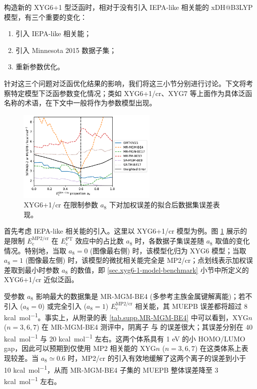 构造新的 XYG6+1 型泛函时，相对于没有引入 IEPA-like 相关能的 xDH@B3LYP 模型，有三个重要的变化：
\begin{enumerate}[nosep]
  \item 引入 IEPA-like 相关能；
  \item 引入 Minnesota 2015 数据子集；
  \item 重新参数优化。
\end{enumerate}
针对这三个问题对泛函优化结果的影响，我们将这三小节分别进行讨论。下文将考察特定模型下泛函参数变化情况；类如 XYG6+1/cr、XYG7 等上面作为具体泛函名称的术语，在下文中一般将作为参数模型出现。

\begin{figure}[h]
  \centering
  \caption{XYG6+1/cr 在限制参数 $a_8$ 下对加权误差的拟合后数据集误差表现。}
  \label{fig.plot-seq-cr-proportion}
  \includegraphics[width=0.6\textwidth]{assets/plot-seq-cr-proportion.pdf}
\end{figure}

首先考虑 IEPA-like 相关能的引入。这里以 XYG6+1/cr 模型为例。图 \ref{fig.plot-seq-cr-proportion} 展示的是限制 $E_\mathrm{c}^\text{MP2/cr}$ 在 $E_\mathrm{c}^\mathrm{PT}$ 效应中的占比数 $a_8$ 时，各数据子集误差随 $a_8$ 取值的变化情况。特别地，当取 $a_8 = 0$ (图像最右侧) 时，该模型化归为 XYG6 模型；当取 $a_8 = 1$ (图像最左侧) 时，该模型的微扰相关能完全是 MP2/cr；点划线表示加权误差取到最小时参数 $a_8$ 的数值，即 \ref{sec.xyg6-1-model-benchmark} 小节中所定义的 XYG6+1/cr 近似泛函。

受参数 $a_8$ 影响最大的数据集是 MR-MGM-BE4 (多参考主族金属键解离能)；若不引入 ($a_8 = 0$) 或完全引入 ($a_8 = 1$) $E_\mathrm{c}^\mathrm{MP2/cr}$ 相关能，其 MUEPB 误差都将超过 8 \si{kcal.mol^{-1}}。事实上，从附录的表 \ref{tab.supp.MR-MGM-BE4} 中可以看到，XYG$n$ ($n=3,6,7$) 在 MR-MGM-BE4 测评中，阴离子  与  的误差很大；其误差分别在 40 \si{kcal.mol^{-1}} 与 20 \si{kcal.mol^{-1}} 左右。这两个体系具有 1 eV 的小 HOMO/LUMO gap，因此可以预期到仅使用 MP2 相关能的 XYG$n$ ($n=3,6,7$) 在这类体系上表现较差。当 $a_8 \simeq 0.6$ 时，MP2/cr 的引入有效地缓解了这两个离子的误差到小于 10 \si{kcal.mol^{-1}}，从而 MR-MGM-BE4 子集的 MUEPB 整体误差降至 3 \si{kcal.mol^{-1}} 左右。

